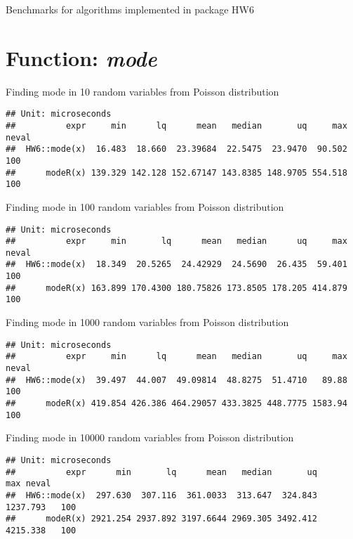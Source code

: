\documentclass[pdftex,12pt]{article}\usepackage[]{graphicx}\usepackage[]{color}
\makeatletter
\newenvironment{kframe}{%
 \def\at@end@of@kframe{}%
 \ifinner\ifhmode%
  \def\at@end@of@kframe{\end{minipage}}%
  \begin{minipage}{\columnwidth}%
 \fi\fi%
 \def\FrameCommand##1{\hskip\@totalleftmargin \hskip-\fboxsep
 \colorbox{shadecolor}{##1}\hskip-\fboxsep
     \hskip-\linewidth \hskip-\@totalleftmargin \hskip\columnwidth}%
 \MakeFramed {\advance\hsize-\width
   \@totalleftmargin\z@ \linewidth\hsize
   \@setminipage}}%
 {\par\unskip\endMakeFramed%
 \at@end@of@kframe}
\newenvironment{knitrout}{}{} %
\makeatother
\begin{document}
\begin{center}
{\Huge Benchmarks for algorithms implemented in package \textsf{HW6}}

\end{center}

\section{Function: \emph{mode}}
Finding mode in 10 random variables from Poisson distribution
\begin{knitrout}
\color{fgcolor}\begin{kframe}
\begin{verbatim}
## Unit: microseconds
##          expr     min      lq      mean   median       uq     max neval
##  HW6::mode(x)  16.483  18.660  23.39684  22.5475  23.9470  90.502   100
##      modeR(x) 139.329 142.128 152.67147 143.8385 148.9705 554.518   100
\end{verbatim}
\end{kframe}
\end{knitrout}
Finding mode in 100 random variables from Poisson distribution
\begin{knitrout}
\color{fgcolor}\begin{kframe}
\begin{verbatim}
## Unit: microseconds
##          expr     min       lq      mean   median      uq     max neval
##  HW6::mode(x)  18.349  20.5265  24.42929  24.5690  26.435  59.401   100
##      modeR(x) 163.899 170.4300 180.75826 173.8505 178.205 414.879   100
\end{verbatim}
\end{kframe}
\end{knitrout}
Finding mode in 1000 random variables from Poisson distribution
\begin{knitrout}
\color{fgcolor}\begin{kframe}
\begin{verbatim}
## Unit: microseconds
##          expr     min      lq      mean   median       uq     max neval
##  HW6::mode(x)  39.497  44.007  49.09814  48.8275  51.4710   89.88   100
##      modeR(x) 419.854 426.386 464.29057 433.3825 448.7775 1583.94   100
\end{verbatim}
\end{kframe}
\end{knitrout}
Finding mode in 10000 random variables from Poisson distribution
\begin{knitrout}
\color{fgcolor}\begin{kframe}
\begin{verbatim}
## Unit: microseconds
##          expr      min       lq      mean   median       uq      max neval
##  HW6::mode(x)  297.630  307.116  361.0033  313.647  324.843 1237.793   100
##      modeR(x) 2921.254 2937.892 3197.6644 2969.305 3492.412 4215.338   100
\end{verbatim}
\end{kframe}
\end{knitrout}
\newpage
\end{document}

